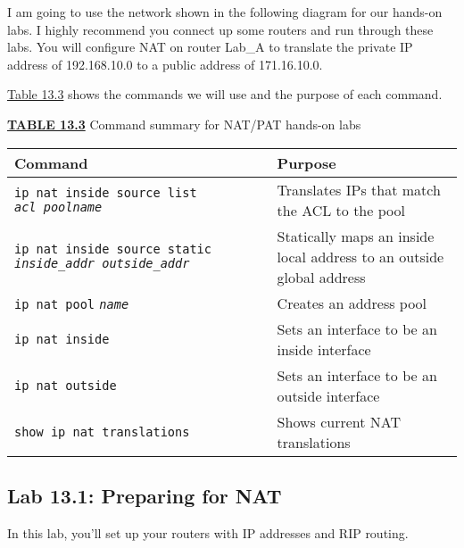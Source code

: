 I am going to use the network shown in the following diagram for our
hands-on labs. I highly recommend you connect up some routers and run
through these labs. You will configure NAT on router Lab\_A to translate
the private IP address of 192.168.10.0 to a public address of
171.16.10.0.

\begin{figure}
\centering
\caption{}
\end{figure}

\protect\hyperlink{c13.xhtmlux5cux23table13-3}{Table 13.3} shows the
commands we will use and the purpose of each command.



{\protect\hyperlink{c13.xhtmlux5cux23tableanchor13-3}{\textbf{TABLE
13.3}} Command summary for NAT/PAT hands-on labs}

\begin{longtable}[]{@{}ll@{}}
\toprule
Command & Purpose\tabularnewline
\midrule
\endhead
\texttt{ip\ nat\ inside\ source\ list}
\emph{\texttt{acl\ pool}\texttt{name}} & Translates IPs that match the
ACL to the pool\tabularnewline
\texttt{ip\ nat\ inside\ source\ static}
\emph{\texttt{inside\_addr\ outside\_addr}} & Statically maps an inside
local address to an outside global address\tabularnewline
\texttt{ip\ nat\ pool} \emph{\texttt{name}} & Creates an address
pool\tabularnewline
\texttt{ip\ nat\ inside} & Sets an interface to be an inside
interface\tabularnewline
\texttt{ip\ nat\ outside} & Sets an interface to be an outside
interface\tabularnewline
\texttt{show\ ip\ nat\ translations} & Shows current NAT
translations\tabularnewline
\bottomrule
\end{longtable}




\subsection{Lab 13.1: Preparing for NAT}

In this lab, you'll set up your routers with IP addresses and RIP
routing.

